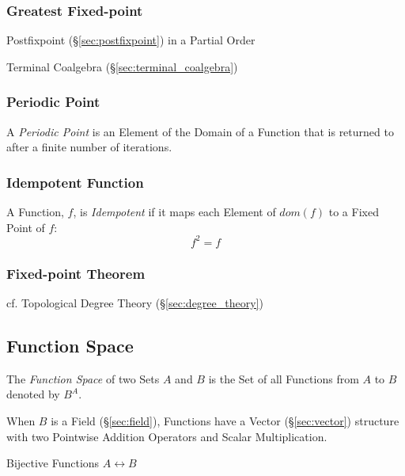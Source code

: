 \subsubsection{Greatest Fixed-point}\label{sec:greatest_fixedpoint}

Postfixpoint (\S\ref{sec:postfixpoint}) in a Partial Order

Terminal Coalgebra (\S\ref{sec:terminal_coalgebra})



\subsubsection{Periodic Point}\label{sec:periodic_point}

A \emph{Periodic Point} is an Element of the Domain of a Function that
is returned to after a finite number of iterations.



\subsubsection{Idempotent Function}\label{sec:idempotent}

A Function, $f$, is \emph{Idempotent} if it maps each Element of
$dom(f)$ to a Fixed Point of $f$:
\[
  f^2 = f
\]



\subsubsection{Fixed-point Theorem}\label{sec:fixedpoint_theorem}

cf. Topological Degree Theory (\S\ref{sec:degree_theory})



\subsection{Function Space}\label{sec:function_space}

The \emph{Function Space} of two Sets $A$ and $B$ is the Set of all
Functions from $A$ to $B$ denoted by $B^A$.

When $B$ is a Field (\S\ref{sec:field}), Functions have a Vector
(\S\ref{sec:vector}) structure with two Pointwise Addition Operators
and Scalar Multiplication. %

Bijective Functions $A \leftrightarrow B$

